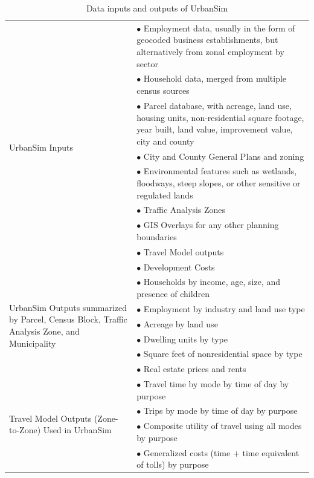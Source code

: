 \begin{table}[htbp]
    \caption{Data inputs and outputs of UrbanSim}
    \label{tab:inputs-outputs}
    \begin{center}
    \begin{tabular}{ p{} p{} }
    \toprule
    
    \multirow{9}{0.3\textwidth}{UrbanSim Inputs}
    & $\bullet$ Employment data, usually in the form of geocoded business establishments, but alternatively from zonal employment by sector\\
    & $\bullet$ Household data, merged from multiple census sources\\
    & $\bullet$ Parcel database, with acreage, land use, housing units, non-residential square footage, year built, land value, improvement value, city and county\\
    & $\bullet$ City and County General Plans and zoning\\
    & $\bullet$ Environmental features such as wetlands, floodways, steep slopes, or other sensitive or regulated lands\\
    & $\bullet$ Traffic Analysis Zones\\
    & $\bullet$ GIS Overlays for any other planning boundaries\\
    & $\bullet$ Travel Model outputs\\
    & $\bullet$ Development Costs \\
    
    \midrule
    
    \multirow{6}{0.3\textwidth}{UrbanSim Outputs summarized by Parcel, Census Block, Traffic Analysis Zone, and Municipality}
    & $\bullet$ Households by income, age, size, and presence of children\\
    & $\bullet$ Employment by industry and land use type\\
    & $\bullet$ Acreage by land use\\
    & $\bullet$ Dwelling units by type\\
    & $\bullet$ Square feet of nonresidential space by type\\
    & $\bullet$ Real estate prices and rents\\
    
    \midrule
    
    \multirow{4}{0.3\textwidth}{Travel Model Outputs (Zone-to-Zone) Used in UrbanSim}
    & $\bullet$ Travel time by mode by time of day by purpose\\
    & $\bullet$ Trips by mode by time of day by purpose\\
    & $\bullet$ Composite utility of travel using all modes by purpose \\
    & $\bullet$ Generalized costs (time + time equivalent of tolls) by purpose \\
    
    \bottomrule
    \end{tabular}
    \end{center}
\end{table}


